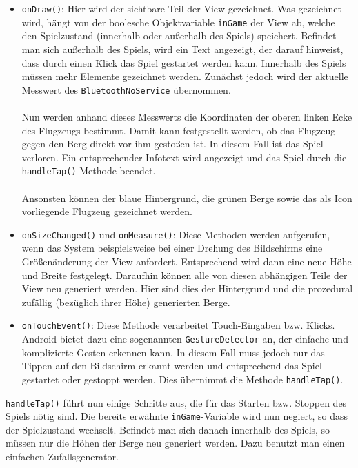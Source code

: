 \begin{itemize}
	\item \texttt{onDraw()}: Hier wird der sichtbare Teil der View gezeichnet.\cite{Src:CustomView} Was gezeichnet wird, hängt von der boolesche Objektvariable \texttt{inGame} der View ab, welche den Spielzustand (innerhalb oder außerhalb des Spiels) speichert. Befindet man sich außerhalb des Spiels, wird ein Text angezeigt, der darauf hinweist, dass durch einen Klick das Spiel gestartet werden kann. Innerhalb des Spiels müssen mehr Elemente gezeichnet werden. Zunächst jedoch wird der aktuelle Messwert des \texttt{BluetoothNoService} übernommen. \\ \\
	Nun werden anhand dieses Messwerts die Koordinaten der oberen linken Ecke des Flugzeugs bestimmt. Damit kann festgestellt werden, ob das Flugzeug gegen den Berg direkt vor ihm gestoßen ist. In diesem Fall ist das Spiel verloren. Ein entsprechender Infotext wird angezeigt und das Spiel durch die \texttt{handleTap()}-Methode beendet. \\ \\
	Ansonsten können der blaue Hintergrund, die grünen Berge sowie das als Icon vorliegende Flugzeug gezeichnet werden.
	\item \texttt{onSizeChanged()} und \texttt{onMeasure()}: Diese Methoden werden aufgerufen, wenn das System beispielsweise bei einer Drehung des Bildschirms eine Größenänderung der View anfordert.\cite{Src:CustomView} Entsprechend wird dann eine neue Höhe und Breite festgelegt. Daraufhin können alle von diesen abhängigen Teile der View neu generiert werden. Hier sind dies der Hintergrund und die prozedural zufällig (bezüglich ihrer Höhe) generierten Berge.
	\item \texttt{onTouchEvent()}: Diese Methode verarbeitet Touch-Eingaben bzw. Klicks. \cite{Src:InteractiveView} Android bietet dazu eine sogenannten \texttt{GestureDetector} an, der einfache und komplizierte Gesten erkennen kann. In diesem Fall muss jedoch nur das Tippen auf den Bildschirm erkannt werden und entsprechend das Spiel gestartet oder gestoppt werden. Dies übernimmt die Methode \texttt{handleTap()}.
\end{itemize}
\texttt{handleTap()} führt nun einige Schritte aus, die für das Starten bzw. Stoppen des Spiels nötig sind. Die bereits erwähnte \texttt{inGame}-Variable wird nun negiert, so dass der Spielzustand wechselt. Befindet man sich danach innerhalb des Spiels, so müssen nur die Höhen der Berge neu generiert werden. Dazu benutzt man einen einfachen Zufallsgenerator. \\ \\
